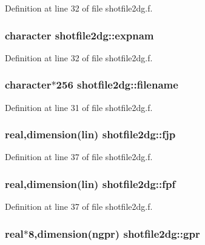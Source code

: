 Definition at line 32 of file shotfile2dg.f.\hypertarget{namespaceshotfile2dg_035718019994ef0564c4ef1e6fbe1477}{
\subsubsection[expnam]{\setlength{\rightskip}{0pt plus 5cm}character {\bf shotfile2dg::expnam}}}
\label{namespaceshotfile2dg_035718019994ef0564c4ef1e6fbe1477}




Definition at line 32 of file shotfile2dg.f.\hypertarget{namespaceshotfile2dg_a8cbd5f464c93ce3054f69959f54f24f}{
\subsubsection[filename]{\setlength{\rightskip}{0pt plus 5cm}character$\ast$256 {\bf shotfile2dg::filename}}}
\label{namespaceshotfile2dg_a8cbd5f464c93ce3054f69959f54f24f}




Definition at line 31 of file shotfile2dg.f.\hypertarget{namespaceshotfile2dg_f6d890808a587cb1d0b5a509040ba1f4}{
\subsubsection[fjp]{\setlength{\rightskip}{0pt plus 5cm}real,dimension({\bf lin}) {\bf shotfile2dg::fjp}}}
\label{namespaceshotfile2dg_f6d890808a587cb1d0b5a509040ba1f4}




Definition at line 37 of file shotfile2dg.f.\hypertarget{namespaceshotfile2dg_edd8eaed3b83cab69ca9550ba0792842}{
\subsubsection[fpf]{\setlength{\rightskip}{0pt plus 5cm}real,dimension({\bf lin}) {\bf shotfile2dg::fpf}}}
\label{namespaceshotfile2dg_edd8eaed3b83cab69ca9550ba0792842}




Definition at line 37 of file shotfile2dg.f.\hypertarget{namespaceshotfile2dg_c50fc1ef94233e32cc1a55c910fd9037}{
\subsubsection[gpr]{\setlength{\rightskip}{0pt plus 5cm}real$\ast$8,dimension(ngpr) {\bf shotfile2dg::gpr}}}
\label{namespaceshotfile2dg_c50fc1ef94233e32cc1a55c910fd9037}




